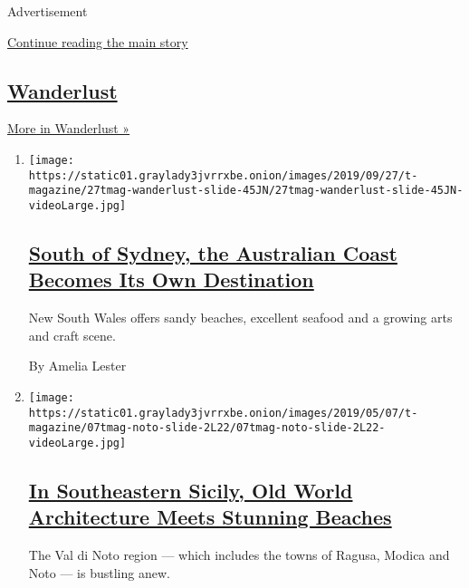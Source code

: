 Advertisement

\protect\hyperlink{after-mid1}{Continue reading the main story}

\hypertarget{wanderlust-1}{%
\subsection{\texorpdfstring{\href{/column/wanderlust}{Wanderlust}}{Wanderlust}}\label{wanderlust-1}}

\href{/column/wanderlust}{More in Wanderlust »}

\begin{enumerate}
\def\labelenumi{\arabic{enumi}.}
\item
  \texttt{[image: https://static01.graylady3jvrrxbe.onion/images/2019/09/27/t-magazine/27tmag-wanderlust-slide-45JN/27tmag-wanderlust-slide-45JN-videoLarge.jpg]}

  \hypertarget{south-of-sydney-the-australian-coast-becomes-its-own-destination}{%
  \subsection{\texorpdfstring{\href{/2019/09/27/t-magazine/new-south-wales-travel.html}{South
  of Sydney, the Australian Coast Becomes Its Own
  Destination}}{South of Sydney, the Australian Coast Becomes Its Own Destination}}\label{south-of-sydney-the-australian-coast-becomes-its-own-destination}}

  New South Wales offers sandy beaches, excellent seafood and a growing
  arts and craft scene.

  By Amelia Lester
\item
  \texttt{[image: https://static01.graylady3jvrrxbe.onion/images/2019/05/07/t-magazine/07tmag-noto-slide-2L22/07tmag-noto-slide-2L22-videoLarge.jpg]}

  \hypertarget{in-southeastern-sicily-old-world-architecture-meets-stunning-beaches}{%
  \subsection{\texorpdfstring{\href{/2019/05/06/t-magazine/val-di-noto-sicily-travel-guide.html}{In
  Southeastern Sicily, Old World Architecture Meets Stunning
  Beaches}}{In Southeastern Sicily, Old World Architecture Meets Stunning Beaches}}\label{in-southeastern-sicily-old-world-architecture-meets-stunning-beaches}}

  The Val di Noto region --- which includes the towns of Ragusa, Modica
  and Noto --- is bustling anew.


\end{enumerate}

